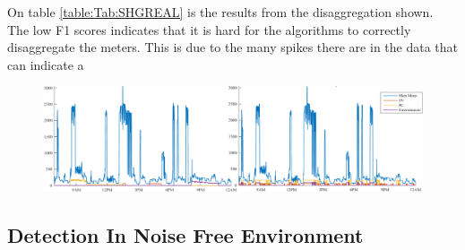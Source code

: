 On table \ref{table:Tab:SHGREAL} is the results from the disaggregation shown. The low F1 scores indicates that it is hard for the algorithms to correctly disaggregate the meters. This is due to the many spikes there are in the data that can indicate a \lipsum[1]

\begin{figure}[H]
\centering
\includegraphics[width=1\textwidth]{billeder/RecognitionEx1.png}
\caption{}
\end{figure}


\subsection{Detection In Noise Free Environment }

